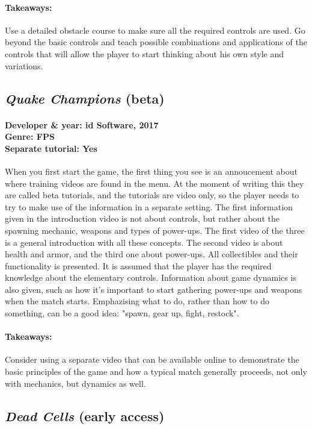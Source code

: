 \paragraph{Takeaways:}
Use a detailed obstacle course to make sure all the required controls are used.
Go beyond the basic controls and teach possible combinations and applications of the controls that will allow the player to start thinking about his own style and variations.

\subsection{\textit{Quake Champions }(beta)}
\paragraph{Developer \& year: id Software, 2017 \\ Genre: FPS \\ Separate tutorial: Yes \\}
When you first start the game, the first thing you see is an annoucement about
where training videos are found in the menu. At the moment of writing this
they are called beta tutorials, and the tutorials are video only, so the
player needs to try to make use of the information in a separate setting. The
first information given in the introduction video is not about controls, but
rather about the spawning mechanic, weapons and types of power-ups. The first
video of the three is a general introduction with all these concepts. The
second video is about health and armor, and the third one about power-ups.
All collectibles and their functionality is presented. It is assumed that the
player has the required knowledge about the elementary controls. Information about game dynamics is also given, such as how it's important to start gathering power-ups and weapons when the match starts. Emphazising what to do, rather than how to do something, can be a good idea: "spawn, gear up, fight, restock".
\paragraph{Takeaways:}
Consider using a separate video that can be available online to demonstrate the basic principles of the game and how a typical match generally proceeds, not only with mechanics, but dynamics as well.

\subsection{\textit{Dead Cells } (early access)}
